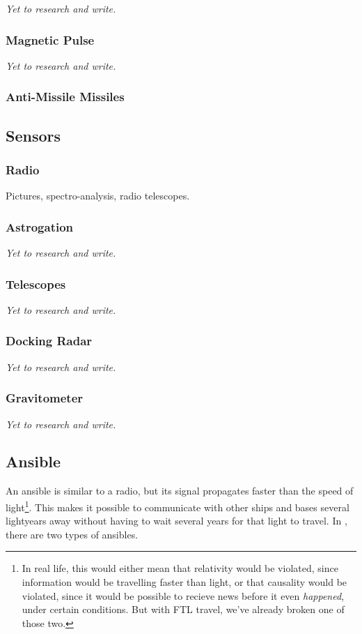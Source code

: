 \textit{Yet to research and write.}

\subsubsection{Magnetic Pulse}

\textit{Yet to research and write.}

\subsubsection{Anti-Missile Missiles}

\subsection{Sensors}

\subsubsection{Radio}
Pictures, spectro-analysis, radio telescopes.

\subsubsection{Astrogation}

\textit{Yet to research and write.}

\subsubsection{Telescopes}

\textit{Yet to research and write.}

\subsubsection{Docking Radar}

\textit{Yet to research and write.}

\subsubsection{Gravitometer}

\textit{Yet to research and write.}

\subsection{Ansible}
\par
An ansible is similar to a radio, but its signal propagates faster than the speed of light\footnote{In real life, this would either mean that relativity would be violated, since information would be travelling faster than light, or that causality would be violated, since it would be possible to recieve news before it even \textit{happened}, under certain conditions. But with FTL travel, we've already broken one of those two.}. This makes it possible to communicate with other ships and bases several lightyears away without having to wait several years for that light to travel. In \getTitle, there are two types of ansibles.

